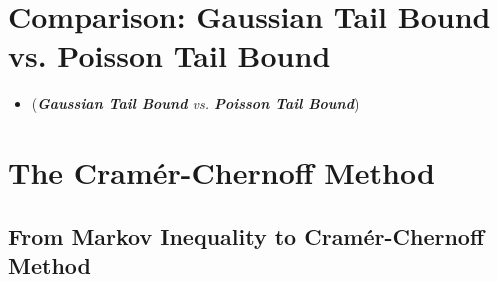 \documentclass[11pt]{article}
\begin{document}
\section{Comparison: Gaussian Tail Bound vs. Poisson Tail Bound}
\begin{itemize}
\item \begin{remark} (\emph{\textbf{Gaussian Tail Bound} vs. \textbf{Poisson Tail Bound}})\\
\end{remark}
\end{itemize}

\newpage
\section{The Cram{\'e}r-Chernoff Method}
\subsection{From Markov Inequality to Cram\'er-Chernoff Method}
\end{document}
